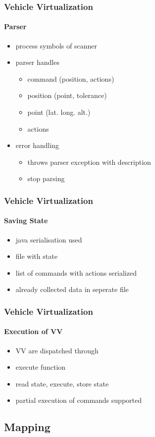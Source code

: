 \documentclass{beamer}
\begin{document}
\begin{frame}\frametitle{Vehicle Virtualization}\framesubtitle{Parser}
\begin{itemize}
\item process symbols of scanner
\item parser handles 
\begin{itemize}
  \item command (position, actions)
  \item position (point, tolerance)
  \item point (lat. long. alt.)
  \item actions  
\end{itemize} 
\item error handling
\begin{itemize}
  \item throws parser exception with description
  \item stop parsing
\end{itemize} 
\end{itemize} 
\end{frame}

\begin{frame}\frametitle{Vehicle Virtualization}\framesubtitle{Saving State}
\begin{itemize}
\item java serialisation used
\item file with state
\item list of commands with actions serialized
\item already collected data in seperate file
\end{itemize} 
\end{frame}

\begin{frame}\frametitle{Vehicle Virtualization}\framesubtitle{Execution of VV}
\begin{itemize}
\item VV are dispatched through 
\item execute function
\item read state, execute, store state
\item partial execution of commands supported
\end{itemize} 
\end{frame}



\subsection{Mapping}
\end{document}
